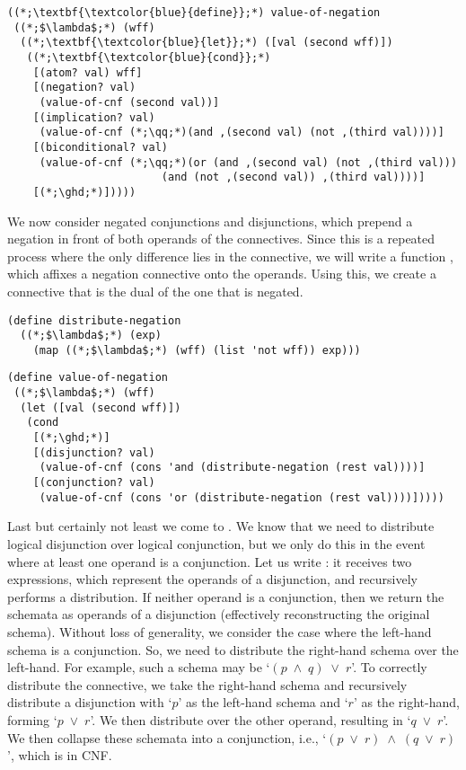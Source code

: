 \begin{cl}[]{}
\begin{lstlisting}[language=MySOutput]
((*;\textbf{\textcolor{blue}{define}};*) value-of-negation
 ((*;$\lambda$;*) (wff)
  ((*;\textbf{\textcolor{blue}{let}};*) ([val (second wff)])
   ((*;\textbf{\textcolor{blue}{cond}};*)
    [(atom? val) wff]
    [(negation? val) 
     (value-of-cnf (second val))]
    [(implication? val) 
     (value-of-cnf (*;\qq;*)(and ,(second val) (not ,(third val))))]
    [(biconditional? val) 
     (value-of-cnf (*;\qq;*)(or (and ,(second val) (not ,(third val)))
                        (and (not ,(second val)) ,(third val))))]
    [(*;\ghd;*)]))))
\end{lstlisting}
\end{cl}

We now consider negated conjunctions and disjunctions, which prepend a negation in front of both operands of the connectives. Since this is a repeated process where the only difference lies in the connective, we will write a function , which affixes a negation connective onto the operands. Using this, we create a connective that is the dual of the one that is negated.

\begin{cl}[]{}
\begin{lstlisting}[language=MyScheme]
(define distribute-negation
  ((*;$\lambda$;*) (exp)
    (map ((*;$\lambda$;*) (wff) (list 'not wff)) exp)))
\end{lstlisting}
\end{cl}

\begin{cl}[]{}
\begin{lstlisting}[language=MyScheme]
(define value-of-negation
 ((*;$\lambda$;*) (wff)
  (let ([val (second wff)])
   (cond
    [(*;\ghd;*)]
    [(disjunction? val) 
     (value-of-cnf (cons 'and (distribute-negation (rest val))))]
    [(conjunction? val) 
     (value-of-cnf (cons 'or (distribute-negation (rest val))))]))))
\end{lstlisting}
\end{cl}

Last but certainly not least we come to . We know that we need to distribute logical disjunction over logical conjunction, but we only do this in the event where at least one operand is a conjunction. Let us write : it receives two expressions, which represent the operands of a disjunction, and recursively performs a distribution. If neither operand is a conjunction, then we return the schemata as operands of a disjunction (effectively reconstructing the original schema). Without loss of generality, we consider the case where the left-hand schema is a conjunction. So, we need to distribute the right-hand schema over the left-hand. For example, such a schema may be `$(p\;\land\;q)\;\lor\;r$'. To correctly distribute the connective, we take the right-hand schema and recursively distribute a disjunction with `$p$' as the left-hand schema and `$r$' as the right-hand, forming `$p\;\lor\;r$'. We then distribute over the other operand, resulting in `$q\;\lor\;r$'. We then collapse these schemata into a conjunction, i.e., `$(p\;\lor\;r)\;\land\;(q\;\lor\;r)$', which is in CNF.

